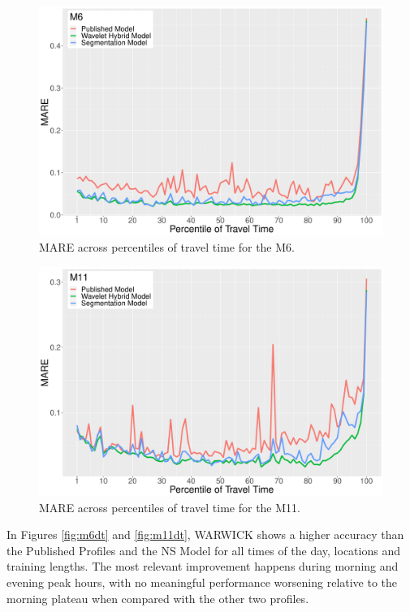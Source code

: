 \documentclass[a4paper, 10pt, conference]{ieeeconf}      %
\begin{document}
\begin{figure}[htbp]
	\centerline{\includegraphics[width=\linewidth]{./images/M6_quantile_1_ab_8_12.pdf}}
	\caption{MARE across percentiles of travel time for the M6.}
	\label{fig:m6q}
\end{figure}
\begin{figure}[htbp]
	\centerline{\includegraphics[width=\linewidth]{./images/M11_quantile_1_ab_8_12.pdf}}
	\caption{MARE across percentiles of travel time for the M11.}
	\label{fig:m11q}
\end{figure}
In Figures \ref{fig:m6dt} and \ref{fig:m11dt}, WARWICK shows a higher accuracy than the Published Profiles and the NS Model for all times of the day, locations and training lengths. 
The most relevant improvement happens during morning and evening peak hours, with no meaningful performance worsening relative to the morning plateau when compared with the other two profiles.
\end{document}
